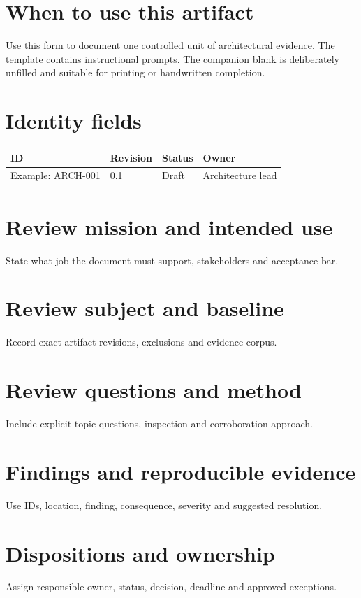 \documentclass[10pt,letterpaper]{article}
\begin{document}
\DocProvenance
\section{When to use this artifact}
Use this form to document one controlled unit of architectural evidence. The template contains instructional prompts. The companion blank is deliberately unfilled and suitable for printing or handwritten completion.

\section{Identity fields}
\small
\begin{tabularx}{\linewidth}{@{}YYYY@{}}
\toprule
\textbf{ID} & \textbf{Revision} & \textbf{Status} & \textbf{Owner} \\
\midrule
Example: ARCH-001 & 0.1 & Draft & Architecture lead \\
\bottomrule
\end{tabularx}
\normalsize
\section{Review mission and intended use}
State what job the document must support, stakeholders and acceptance bar.

\section{Review subject and baseline}
Record exact artifact revisions, exclusions and evidence corpus.

\section{Review questions and method}
Include explicit topic questions, inspection and corroboration approach.

\section{Findings and reproducible evidence}
Use IDs, location, finding, consequence, severity and suggested resolution.

\section{Dispositions and ownership}
Assign responsible owner, status, decision, deadline and approved exceptions.
\end{document}
